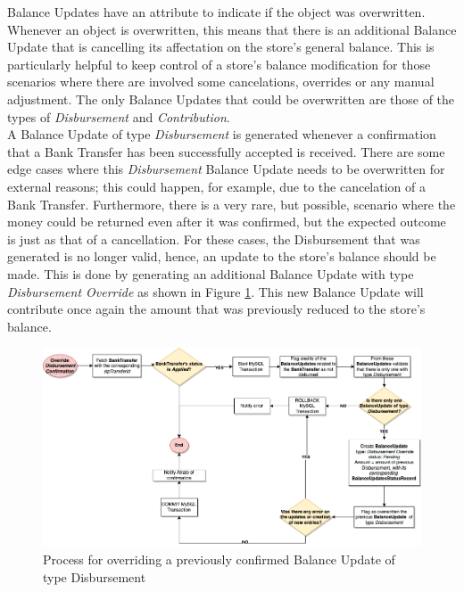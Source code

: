 Balance Updates have an attribute to indicate if the object was overwritten. Whenever an object is overwritten, this means that there is an additional Balance Update that is cancelling its affectation on the store’s general balance. This is particularly helpful to keep control of a store’s balance modification for those scenarios where there are involved some cancelations, overrides or any manual adjustment. The only Balance Updates that could be overwritten are those of the types of \textit{Disbursement} and \textit{Contribution}.\\

A Balance Update of type \textit{Disbursement} is generated whenever a confirmation that a Bank Transfer has been successfully accepted is received. There are some edge cases where this \textit{Disbursement} Balance Update needs to be overwritten for external reasons; this could happen, for example, due to the cancelation of a Bank Transfer. Furthermore, there is a very rare, but possible, scenario where the money could be returned even after it was confirmed, but the expected outcome is just as that of a cancellation. For these cases, the Disbursement that was generated is no longer valid, hence, an update to the store’s balance should be made. This is done by generating an additional Balance Update with type \textit{Disbursement Override} as shown in Figure \ref{fig:override_disbursement}. This new Balance Update will contribute once again the amount that was previously reduced to the store’s balance.\\

\begin{figure} [H]
    \centering
    \includegraphics[scale = 0.4]{assets/diagrams/DisbursementOverride.png}
    \caption{Process for overriding a previously confirmed Balance Update of type Disbursement}\label{fig:override_disbursement}
\end{figure}


